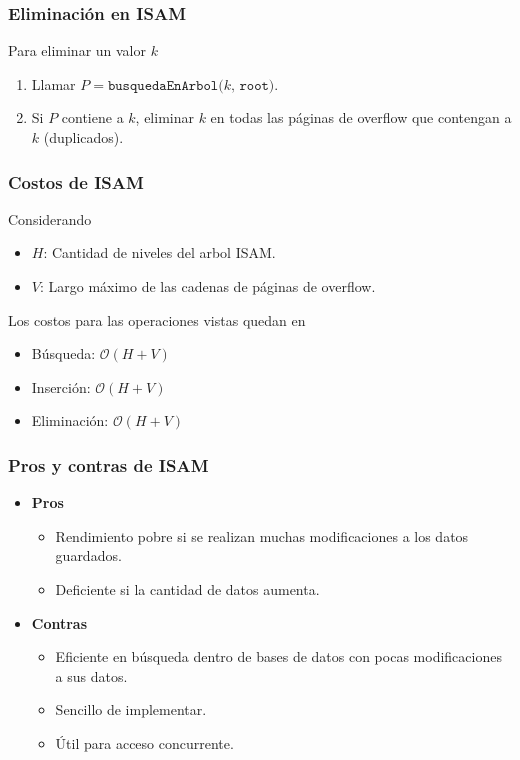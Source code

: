 \subsubsection{Eliminación en ISAM}
Para eliminar un valor $k$
\begin{enumerate}
  \item Llamar $P = \texttt{busquedaEnArbol($k$, root)}$.
  \item Si $P$ contiene a $k$, eliminar $k$ en todas las páginas de overflow que contengan a $k$ (duplicados).
\end{enumerate}

\subsubsection{Costos de ISAM}
Considerando
\begin{itemize}
  \item $H$: Cantidad de niveles del arbol ISAM.
  \item $V$: Largo máximo de las cadenas de páginas de overflow.
\end{itemize}

Los costos para las operaciones vistas quedan en
\begin{itemize}
  \item Búsqueda: $\mathcal{O}(H + V)$
  \item Inserción: $\mathcal{O}(H + V)$
  \item Eliminación: $\mathcal{O}(H + V)$
\end{itemize}

\subsubsection{Pros y contras de ISAM}
\begin{itemize}
  \item \textbf{Pros}
  \begin{itemize}
    \item Rendimiento pobre si se realizan muchas modificaciones a los datos guardados.
    \item Deficiente si la cantidad de datos aumenta.
  \end{itemize}
  \item \textbf{Contras}
  \begin{itemize}
    \item Eficiente en búsqueda dentro de bases de datos con pocas modificaciones a sus datos.
    \item Sencillo de implementar.
    \item Útil para acceso concurrente.
  \end{itemize}
\end{itemize}



